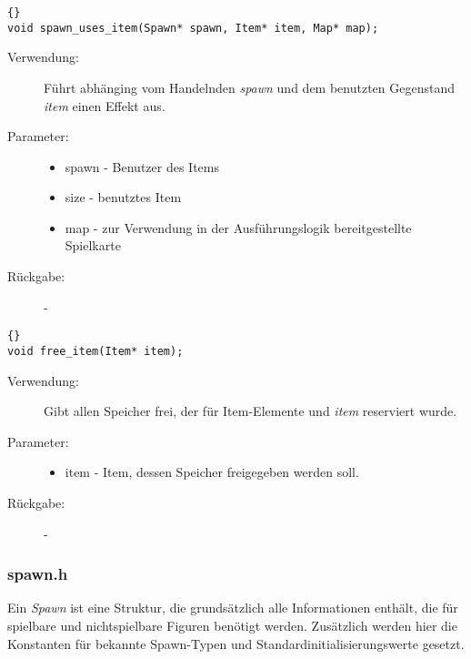 \documentclass[11pt,a4paper,notitlepage]{report}
\begin{document}
		\begin{lstlisting}[caption=spawn\_uses\_item]{}
void spawn_uses_item(Spawn* spawn, Item* item, Map* map);
		\end{lstlisting}
		
	\begin{description}
		\item[Verwendung:] Führt abhänging vom Handelnden \textit{spawn} und dem benutzten Gegenstand \textit{item} einen Effekt aus.
		\item[Parameter:] \hfill
		\begin{itemize}
			\item spawn - Benutzer des Items
			\item size - benutztes Item
			\item map - zur Verwendung in der Ausführungslogik bereitgestellte Spielkarte
		\end{itemize}
		\item[Rückgabe:] -
	\end{description}
	
		\begin{lstlisting}[caption=free\_spawn]{}
void free_item(Item* item);
		\end{lstlisting}
		
	\begin{description}
		\item[Verwendung:] Gibt allen Speicher frei, der für Item-Elemente und \textit{item} reserviert wurde.
		\item[Parameter:] \hfill
		\begin{itemize}
			\item item - Item, dessen Speicher freigegeben werden soll.
		\end{itemize}
		\item[Rückgabe:] -
	\end{description}
	
	\newpage
	\subsubsection*{spawn.h}
	Ein \textit{Spawn} ist eine Struktur, die grundsätzlich alle Informationen enthält, die für spielbare und nichtspielbare Figuren benötigt werden. Zusätzlich werden hier die Konstanten für bekannte Spawn-Typen und Standardinitialisierungswerte gesetzt.	
	
\end{document}
